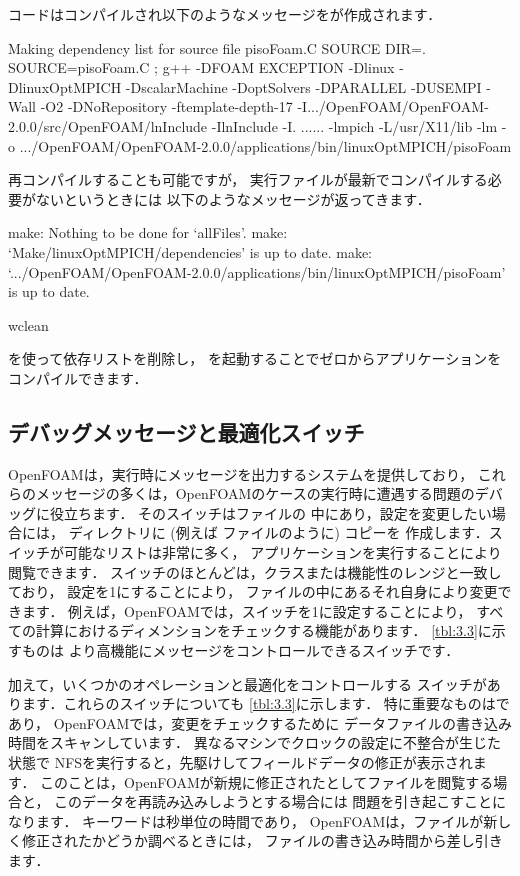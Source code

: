 コードはコンパイルされ以下のようなメッセージをが作成されます．
\begin{OFverbatim}[file]
Making dependency list for source file pisoFoam.C
SOURCE DIR=.
SOURCE=pisoFoam.C ;
g++ -DFOAM EXCEPTION -Dlinux -DlinuxOptMPICH
-DscalarMachine -DoptSolvers -DPARALLEL -DUSEMPI -Wall -O2 -DNoRepository
-ftemplate-depth-17 -I.../OpenFOAM/OpenFOAM-2.0.0/src/OpenFOAM/lnInclude
-IlnInclude
-I.
......
-lmpich -L/usr/X11/lib -lm
-o .../OpenFOAM/OpenFOAM-2.0.0/applications/bin/linuxOptMPICH/pisoFoam
\end{OFverbatim}
再コンパイルすることも可能ですが，
実行ファイルが最新でコンパイルする必要がないというときには
以下のようなメッセージが返ってきます．
\begin{OFverbatim}[file]
make: Nothing to be done for `allFiles'.
make: `Make/linuxOptMPICH/dependencies' is up to date.
make: `.../OpenFOAM/OpenFOAM-2.0.0/applications/bin/linuxOptMPICH/pisoFoam'
is up to date.
\end{OFverbatim}

\begin{OFverbatim}[terminal]
wclean
\end{OFverbatim}
を使って依存リストを削除し，
を起動することでゼロからアプリケーションをコンパイルできます．


\subsection{デバッグメッセージと最適化スイッチ}
\label{ssec:3.2.5}
OpenFOAMは，実行時にメッセージを出力するシステムを提供しており，
これらのメッセージの多くは，OpenFOAMのケースの実行時に遭遇する問題のデバッグに役立ちます．
そのスイッチはファイルの
中にあり，設定を変更したい場合には，
ディレクトリに (例えば
ファイルのように) コピーを
作成します．スイッチが可能なリストは非常に多く，
アプリケーションを実行することにより閲覧できます．
スイッチのほとんどは，クラスまたは機能性のレンジと一致しており，
設定を1にすることにより，
ファイルの中にあるそれ自身により変更できます．
例えば，OpenFOAMでは，スイッチを1に設定することにより，
すべての計算におけるディメンションをチェックする機能があります．
\autoref{tbl:3.3}に示すものは
より高機能にメッセージをコントロールできるスイッチです．

加えて，いくつかのオペレーションと最適化をコントロールする
スイッチがあります．これらのスイッチについても
\autoref{tbl:3.3}に示します．
特に重要なものはであり，
OpenFOAMでは，変更をチェックするために
データファイルの書き込み時間をスキャンしています．
異なるマシンでクロックの設定に不整合が生じた状態で
NFSを実行すると，先駆けしてフィールドデータの修正が表示されます．
このことは，OpenFOAMが新規に修正されたとしてファイルを閲覧する場合と，
このデータを再読み込みしようとする場合には
問題を引き起こすことになります．
キーワードは秒単位の時間であり，
OpenFOAMは，ファイルが新しく修正されたかどうか調べるときには，
ファイルの書き込み時間から差し引きます．


